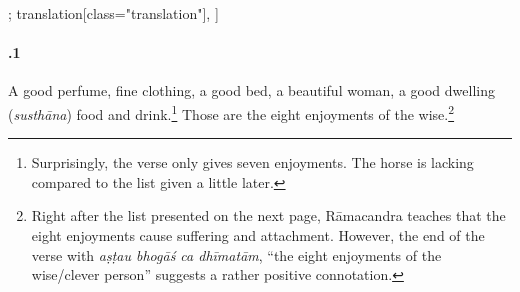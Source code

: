 \begin{alignment}[
  texts=edition[class="edition"];
  translation[class="translation"],
  ]
\begin{translation}
\begin{tlate}[22_1]
      \paragraph{.1} A good perfume, fine clothing, a good bed, a beautiful woman, a good dwelling (\textit{susthāna})
       food and drink.\footnote{Surprisingly, the verse only gives seven enjoyments. 
       The horse is lacking compared to the list given a little later.} 
       Those are the eight enjoyments of the wise.\footnote{Right after the list presented on the next page, 
       Rāmacandra teaches that the eight enjoyments cause suffering and attachment. 
       However, the end of the verse with \textit{aṣṭau bhogāś ca dhīmatām}, ``the eight enjoyments of the wise/clever person''
        suggests a rather positive connotation.}
      \flushpage
        \end{tlate}
  \end{translation}
\end{alignment}
\pagebreak %

